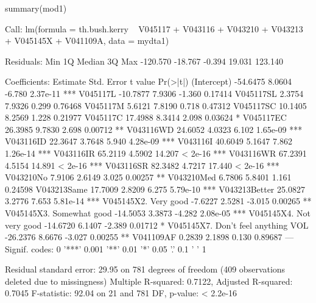 \begin{Schunk}
\begin{Sinput}
 summary(mod1)
\end{Sinput}
\begin{Soutput}
Call:
lm(formula = th.bush.kerry ~ V045117 + V043116 + V043210 + V043213 + 
    V045145X + V041109A, data = mydta1)

Residuals:
     Min       1Q   Median       3Q      Max 
-120.570  -18.767   -0.394   19.031  123.140 

Coefficients:
                                     Estimate Std. Error t value Pr(>|t|)    
(Intercept)                          -54.6475     8.0604  -6.780 2.37e-11 ***
V045117L                             -10.7877     7.9306  -1.360  0.17414    
V045117SL                              2.3754     7.9326   0.299  0.76468    
V045117M                               5.6121     7.8190   0.718  0.47312    
V045117SC                             10.1405     8.2569   1.228  0.21977    
V045117C                              17.4988     8.3414   2.098  0.03624 *  
V045117EC                             26.3985     9.7830   2.698  0.00712 ** 
V043116WD                             24.6052     4.0323   6.102 1.65e-09 ***
V043116ID                             22.3647     3.7648   5.940 4.28e-09 ***
V043116I                              40.6049     5.1647   7.862 1.26e-14 ***
V043116IR                             65.2119     4.5902  14.207  < 2e-16 ***
V043116WR                             67.2391     4.5154  14.891  < 2e-16 ***
V043116SR                             82.3482     4.7217  17.440  < 2e-16 ***
V043210No                              7.9106     2.6149   3.025  0.00257 ** 
V043210Med                             6.7806     5.8401   1.161  0.24598    
V043213Same                           17.7009     2.8209   6.275 5.79e-10 ***
V043213Better                         25.0827     3.2776   7.653 5.81e-14 ***
V045145X2. Very good                  -7.6227     2.5281  -3.015  0.00265 ** 
V045145X3. Somewhat good             -14.5053     3.3873  -4.282 2.08e-05 ***
V045145X4. Not very good             -14.6720     6.1407  -2.389  0.01712 *  
V045145X7. Don't feel anything {VOL} -26.2376     8.6676  -3.027  0.00255 ** 
V041109AF                              0.2839     2.1898   0.130  0.89687    
---
Signif. codes:  0 '***' 0.001 '**' 0.01 '*' 0.05 '.' 0.1 ' ' 1

Residual standard error: 29.95 on 781 degrees of freedom
  (409 observations deleted due to missingness)
Multiple R-squared:  0.7122,	Adjusted R-squared:  0.7045 
F-statistic: 92.04 on 21 and 781 DF,  p-value: < 2.2e-16
\end{Soutput}
\end{Schunk}
